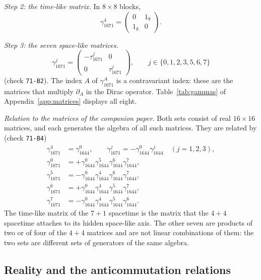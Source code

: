 \emph{Step 2: the time-like matrix.} In $8\times8$ blocks,
\begin{equation}
\gamma_{1671}^4=\begin{pmatrix}0&1_8\\1_8&0\end{pmatrix}.
\label{eq:gamma4}
\end{equation}

\emph{Step 3: the seven space-like matrices.}
\begin{equation}
\gamma_{1671}^j=\begin{pmatrix}-\tau_{1671}^j&0\\0&\tau_{1671}^j\end{pmatrix},\qquad j\in\{0,1,2,3,5,6,7\}
\label{eq:gamma}
\end{equation}
(check \texttt{71-B2}). The index $A$ of $\gamma_{1671}^A$ is a contravariant index: these are the
matrices that multiply $\partial_A$ in the Dirac operator. Table~\ref{tab:gammas} of
Appendix~\ref{app:matrices} displays all eight.

\emph{Relation to the matrices of the companion paper.} Both sets consist of real $16\times16$
matrices, and each generates the algebra of all such matrices. They are related by
(check \texttt{71-B4})
\begin{align}
\gamma_{1671}^4&=\gamma_{1644}^0,\qquad\gamma_{1671}^j=-\gamma_{1644}^0\gamma_{1644}^j\quad(j=1,2,3),\nonumber\\
\gamma_{1671}^0&=+\gamma_{1644}^0\gamma_{1644}^5\gamma_{1644}^6\gamma_{1644}^7,\nonumber\\
\gamma_{1671}^5&=-\gamma_{1644}^0\gamma_{1644}^4\gamma_{1644}^6\gamma_{1644}^7,\nonumber\\
\gamma_{1671}^6&=+\gamma_{1644}^0\gamma_{1644}^4\gamma_{1644}^5\gamma_{1644}^7,\nonumber\\
\gamma_{1671}^7&=-\gamma_{1644}^0\gamma_{1644}^4\gamma_{1644}^5\gamma_{1644}^6 .
\label{eq:relation}
\end{align}
The time-like matrix of the $7+1$ spacetime is the matrix that the $4+4$ spacetime attaches to its
hidden space-like axis. The other seven are products of two or of four of the $4+4$ matrices and are
not linear combinations of them: the two sets are different sets of generators of the same algebra.

\subsection{Reality and the anticommutation relations}

